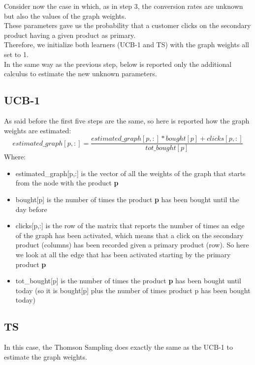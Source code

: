 Consider now the case in which, as in step 3, the conversion rates are unknown but also the values of the graph weights.\\ These parameters gave us the probability that a customer clicks on the secondary product having a given product as primary.\\ Therefore, we initialize both learners (UCB-1 and TS) with the graph weights all set to 1.\\ 
In the same way as the previous step, below is reported only the additional calculus to estimate the new unknown parameters.

\subsection{UCB-1}
As said before the first five steps are the same, so here is reported how the graph weights are estimated:
\begin{equation}
    estimated\_graph[p,:] = \frac{estimated\_graph[p,:] * bought[p] + clicks[p,:]}{tot\_bought[p]}
\end{equation}Where: \begin{itemize}
    \item estimated\_graph[p,:] is the vector of all the weights of the graph that starts from the node with the product {\bf p}
    \item bought[p] is the number of times the product {\bf p} has been bought until the day before
    \item clicks[p,:] is the row of the matrix that reports the number of times an edge of the graph has been activated, which means that a click on the secondary product (columns) has been recorded given a primary product (row). So here we look at all the edge that has been activated starting by the primary product {\bf p}
    \item tot\_bought[p] is the number of times the product {\bf p} has been bought until today (so it is bought[p] plus the number of times product p has been bought today)
\end{itemize}
\subsection{TS}
In this case, the Thomson Sampling does exactly the same as the UCB-1 to estimate the graph weights.
